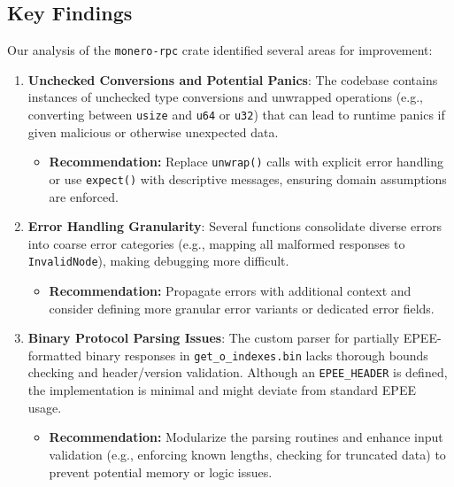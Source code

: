 \documentclass[12pt,a4paper]{article}
\begin{document}
\subsection{Key Findings}
\label{sec:monero-rpc-findings}

Our analysis of the \texttt{monero-rpc} crate identified several areas for improvement:

\begin{enumerate}
    \item \textbf{Unchecked Conversions and Potential Panics}:  
    The codebase contains instances of unchecked type conversions and unwrapped operations (e.g.,
    converting between \texttt{usize} and \texttt{u64} or \texttt{u32}) that can lead to runtime
    panics if given malicious or otherwise unexpected data.
    \begin{itemize}
        \item \textbf{Recommendation:} Replace \texttt{unwrap()} calls with explicit error handling
        or use \texttt{expect()} with descriptive messages, ensuring domain assumptions are
        enforced.
    \end{itemize}

    \item \textbf{Error Handling Granularity}:  
    Several functions consolidate diverse errors into coarse error categories (e.g., mapping all
    malformed responses to \texttt{InvalidNode}), making debugging more difficult.
    \begin{itemize}
        \item \textbf{Recommendation:} Propagate errors with additional context and consider
        defining more granular error variants or dedicated error fields.
    \end{itemize}

    \item \textbf{Binary Protocol Parsing Issues}:  
    The custom parser for partially EPEE-formatted binary responses in \texttt{get\_o\_indexes.bin}
    lacks thorough bounds checking and header/version validation. Although an \texttt{EPEE\_HEADER}
    is defined, the implementation is minimal and might deviate from standard EPEE usage.
    \begin{itemize}
        \item \textbf{Recommendation:} Modularize the parsing routines and enhance input validation
        (e.g., enforcing known lengths, checking for truncated data) to prevent potential memory or
        logic issues.
    \end{itemize}


\end{enumerate}
\end{document}
